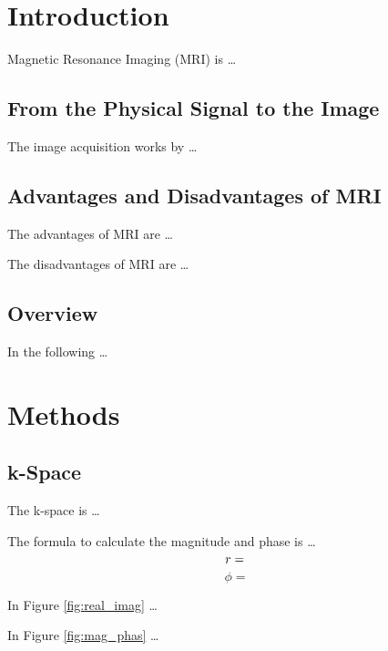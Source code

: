 \documentclass[%
	a4paper, %
	12pt, %
	english, %
	bibtotoc %
]{scrartcl}
\begin{document}


\tableofcontents
\newpage

\section{Introduction}%
\label{sec:einleitung}
Magnetic Resonance Imaging (MRI) is \dots

\subsection{From the Physical Signal to the Image}
The image acquisition works by \dots
\subsection{Advantages and Disadvantages of MRI}
The advantages of MRI are \dots

The disadvantages of MRI are  \dots

\subsection{Overview}
In the following \dots



\section{Methods}
\subsection{k-Space}
The k-space is \dots

The formula to calculate the magnitude and phase is \dots
\begin{equation}
    r =  \\
\end{equation}
\begin{equation}
    \phi = 
\end{equation}

In Figure \ref{fig:real_imag} \dots

In Figure \ref{fig:mag_phas} \dots
\end{document}
